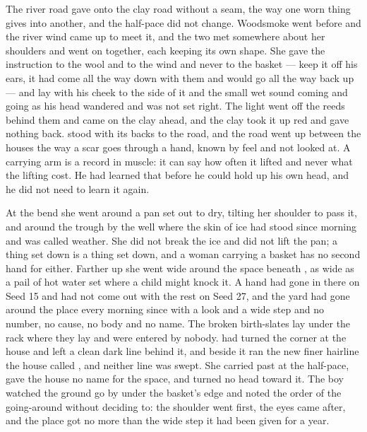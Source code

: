 The river road gave onto the clay road without a seam, the way one worn thing gives into another, and the half-pace did not change. Woodsmoke went before  and the river wind came up to meet it, and the two met somewhere about her shoulders and went on together, each keeping its own shape. She gave the instruction to the wool and to the wind and never to the basket --- keep it off his ears, it had come all the way down with them and would go all the way back up --- and  lay with his cheek to the side of it and the small wet sound coming and going as his head wandered and was not set right. The light went off the reeds behind them and came on the clay ahead, and the clay took it up red and gave nothing back.  stood with its backs to the road, and the road went up between the houses the way a scar goes through a hand, known by feel and not looked at. A carrying arm is a record in muscle: it can say how often it lifted and never what the lifting cost. He had learned that before he could hold up his own head, and he did not need to learn it again.

At the bend she went around a pan set out to dry, tilting her shoulder to pass it, and around the trough by the well where the skin of ice had stood since morning and was called weather. She did not break the ice and did not lift the pan; a thing set down is a thing set down, and a woman carrying a basket has no second hand for either. Farther up she went wide around the space beneath , as wide as a pail of hot water set where a child might knock it. A hand had gone in there on Seed 15 and had not come out with the rest on Seed 27, and the yard had gone around the place every morning since with a look and a wide step and no number, no cause, no body and no name. The broken birth-slates lay under the rack where they lay and were entered by nobody.  had turned the corner at the house and left a clean dark line behind it, and beside it ran the new finer hairline the house called , and neither line was swept. She carried past at the half-pace, gave the house no name for the space, and turned no head toward it. The boy watched the ground go by under the basket's edge and noted the order of the going-around without deciding to: the shoulder went first, the eyes came after, and the place got no more than the wide step it had been given for a year.

